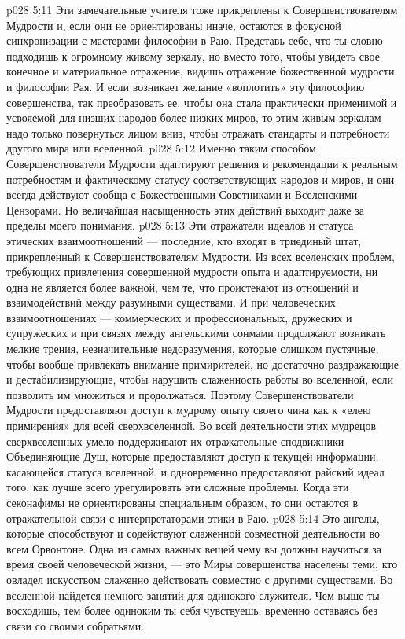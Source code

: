 \vs p028 5:11 \pc {}\bibnobreakspace {} Эти замечательные учителя тоже прикреплены к Совершенствователям Мудрости и, если они не ориентированы иначе, остаются в фокусной синхронизации с мастерами философии в Раю. Представь себе, что ты словно подходишь к огромному живому зеркалу, но вместо того, чтобы увидеть свое конечное и материальное отражение, видишь отражение божественной мудрости и философии Рая. И если возникает желание «воплотить» эту философию совершенства, так преобразовать ее, чтобы она стала практически применимой и усвояемой для низших народов более низких миров, то этим живым зеркалам надо только повернуться лицом вниз, чтобы отражать стандарты и потребности другого мира или вселенной.
\vs p028 5:12 Именно таким способом Совершенствователи Мудрости адаптируют решения и рекомендации к реальным потребностям и фактическому статусу соответствующих народов и миров, и они всегда действуют сообща с Божественными Советниками и Вселенскими Цензорами. Но величайшая насыщенность этих действий выходит даже за пределы моего понимания.
\vs p028 5:13 \pc {}\bibnobreakspace {} Эти отражатели идеалов и статуса этических взаимоотношений --- последние, кто входят в триединый штат, прикрепленный к Совершенствователям Мудрости. Из всех вселенских проблем, требующих привлечения совершенной мудрости опыта и адаптируемости, ни одна не является более важной, чем те, что проистекают из отношений и взаимодействий между разумными существами. И при человеческих взаимоотношениях --- коммерческих и профессиональных, дружеских и супружеских и при связях между ангельскими сонмами продолжают возникать мелкие трения, незначительные недоразумения, которые слишком пустячные, чтобы вообще привлекать внимание примирителей, но достаточно раздражающие и дестабилизирующие, чтобы нарушить слаженность работы во вселенной, если позволить им множиться и продолжаться. Поэтому Совершенствователи Мудрости предоставляют доступ к мудрому опыту своего чина как к «елею примирения» для всей сверхвселенной. Во всей деятельности этих мудрецов сверхвселенных умело поддерживают их отражательные сподвижники Объединяющие Душ, которые предоставляют доступ к текущей информации, касающейся статуса вселенной, и одновременно предоставляют райский идеал того, как лучше всего урегулировать эти сложные проблемы. Когда эти секонафимы не ориентированы специальным образом, то они остаются в отражательной связи с интерпретаторами этики в Раю.
\vs p028 5:14 \pc Это ангелы, которые способствуют и содействуют слаженной совместной деятельности во всем Орвонтоне. Одна из самых важных вещей чему вы должны научиться за время своей человеческой жизни, --- это  Миры совершенства населены теми, кто овладел искусством слаженно действовать совместно с другими существами. Во вселенной найдется немного занятий для одинокого служителя. Чем выше ты восходишь, тем более одиноким ты себя чувствуешь, временно оставаясь без связи со своими собратьями.
